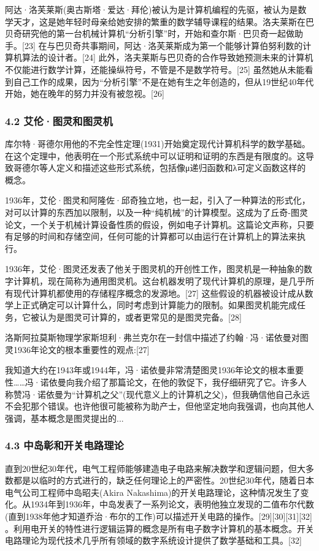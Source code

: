 阿达·洛芙莱斯(奥古斯塔·爱达·拜伦)被认为是计算机编程的先驱，被认为是数学天才，这是她年轻时母亲给她安排的繁重的数学辅导课程的结果。洛夫莱斯在巴贝奇研究他的第一台机械计算机“分析引擎”时，开始和查尔斯·巴贝奇一起做助手。[23] 在与巴贝奇共事期间，阿达·洛芙莱斯成为第一个能够计算伯努利数的计算机算法的设计者。[24] 此外，洛夫莱斯与巴贝奇的合作导致她预测未来的计算机不仅能进行数学计算，还能操纵符号，不管是不是数学符号。[25] 虽然她从未能看到自己工作的成果，因为“分析引擎”不是在她有生之年创造的，但从19世纪40年代开始，她在晚年的努力并没有被忽视。[26]
\subsubsection{4.2 艾伦·图灵和图灵机}
库尔特·哥德尔用他的不完全性定理(1931)开始奠定现代计算机科学的数学基础。在这个定理中，他表明在一个形式系统中可以证明和证明的东西是有限度的。这导致哥德尔等人定义和描述这些形式系统，包括像μ递归函数和λ可定义函数这样的概念。

1936年，艾伦·图灵和阿隆佐·邱奇独立地，也一起，引入了一种算法的形式化，对可以计算的东西加以限制，以及一种“纯机械”的计算模型。这成为了丘奇-图灵论文，一个关于机械计算设备性质的假设，例如电子计算机。这篇论文声称，只要有足够的时间和存储空间，任何可能的计算都可以由运行在计算机上的算法来执行。

1936年，艾伦·图灵还发表了他关于图灵机的开创性工作，图灵机是一种抽象的数字计算机，现在简称为通用图灵机。这台机器发明了现代计算机的原理，是几乎所有现代计算机都使用的存储程序概念的发源地。[27] 这些假设的机器被设计成从数学上正式确定可以计算什么，同时考虑到计算能力的限制。如果图灵机能完成任务，它被认为是图灵可计算的，或者更常见的是图灵完备。[28]

洛斯阿拉莫斯物理学家斯坦利·弗兰克尔在一封信中描述了约翰·冯·诺依曼对图灵1936年论文的根本重要性的观点:[27]

我知道大约在1943年或1944年，冯·诺依曼非常清楚图灵1936年论文的根本重要性……冯·诺依曼向我介绍了那篇论文，在他的敦促下，我仔细研究了它。许多人称赞冯·诺依曼为“计算机之父”(现代意义上的计算机之父)，但我确信他自己永远不会犯那个错误。也许他很可能被称为助产士，但他坚定地向我强调，也向其他人强调，基本概念是图灵提出的...
\subsubsection{4.3 中岛彰和开关电路理论}
直到20世纪30年代，电气工程师能够建造电子电路来解决数学和逻辑问题，但大多数都是以临时的方式进行的，缺乏任何理论上的严密性。20世纪30年代，随着日本电气公司工程师中岛昭夫(Akira Nakashima)的开关电路理论，这种情况发生了变化。从1934年到1936年，中岛发表了一系列论文，表明他独立发现的二值布尔代数(直到1938年他才知道乔治·布尔的工作)可以描述开关电路的操作。[29][30][31][32] 。利用电开关的特性进行逻辑运算的概念是所有电子数字计算机的基本概念。开关电路理论为现代技术几乎所有领域的数字系统设计提供了数学基础和工具。[32]

